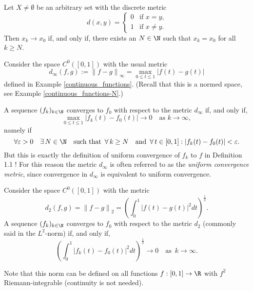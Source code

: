 \begin{example}
Let $X \not= \emptyset$ be an arbitrary set with the discrete metric
\[
d(x,y) = \begin{cases} 0 & \text{if $x = y$,} \\ 1 & \text{if $x \not= y$.} \end{cases}
\]
Then $x_k \to x_0$ if, and only if, there exists an $N \in \N$ such that $x_k = x_0$ for all
$k \ge N$.
\end{example}

\np

\begin{example}
Consider the space $C^0([0,1])$ with the usual metric
\[
d_\infty(f,g):= \left\|f-g\right\|_{\infty} = \max_{0 \le t \le 1} \left|f(t) - g(t)\right|
\]%
defined in Example \ref{continuous_functions}. (Recall that this is a normed space, see Example \ref{continuous_functions-N}.)

A sequence $(f_k)_{k \in \N}$ converges to $f_0$ with respect to the metric $d_\infty$ if, and only if,
$$
\max_{0 \le t \le 1} |f_k(t) - f_0(t)| \to 0 \quad \textrm{as } k\to \infty,
$$
namely if
\[
\forall \varepsilon > 0 \quad \exists \,N \in \N \quad\textrm{such that } \, \forall \, k \ge N \quad \textrm{and } \, \forall \, t \in [0,1] : \left|f_k(t) - f_0(t)\right| < \varepsilon.
\]%
But this is exactly the definition of uniform convergence of $f_k$ to $f$ in 
Definition 1.1%
! For this reason the metric $d_\infty$ is often referred to as the \textit{uniform convergence metric}, since convergence in $d_\infty$ is equivalent to uniform convergence.
\end{example}

\begin{example}
Consider the space $C^0([0,1])$ with the metric
\[
d_2(f,g) = \left\|f-g\right\|_{2} = \left(\int_0^1 \left|f(t) - g(t)\right|^2 dt\right)^\frac12.
\]%
A sequence $(f_k)_{k \in \N}$ converges to $f_0$ with respect to the metric $d_2$ (commonly said in the $L^2$-norm) if, and only if,
\[
\left(\int_0^1 \left|f_k(t) - f_0(t)\right|^2 dt\right)^\frac12 \to 0 \quad \textrm{as } \, k\to \infty.
\]%
\smallskip

Note that this norm can be defined on all functions $f: [0,1] \to \R$ with $f^2$ Riemann-integrable (continuity is not needed).

\end{example}


